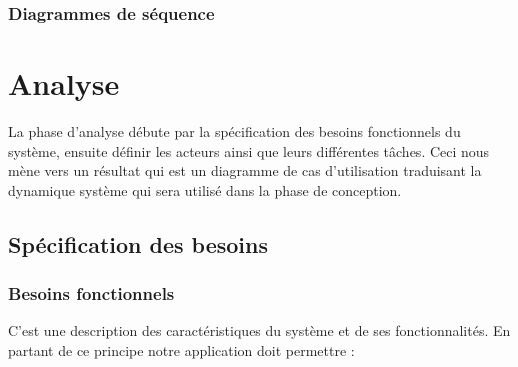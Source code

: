 \subsubsection{Diagrammes de séquence}

\section{Analyse}
La phase d’analyse débute par la spécification des besoins fonctionnels du système, ensuite définir les acteurs ainsi que leurs différentes tâches. Ceci nous mène vers un résultat qui est un diagramme de cas d’utilisation traduisant la dynamique système qui sera utilisé dans la phase de conception.

\subsection{Spécification des besoins}
\subsubsection{Besoins fonctionnels}
C’est une description des caractéristiques du système et de ses fonctionnalités. En partant de ce principe notre application doit permettre :

